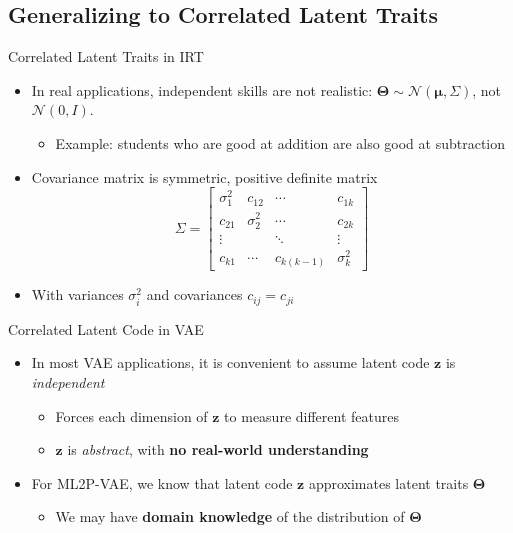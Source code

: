 \documentclass{beamer}
\newcommand{\vect}[1]{\boldsymbol{#1}}
\theoremstyle{definition}
\begin{document}
\subsection{Generalizing to Correlated Latent Traits}

\begin{frame}{Correlated Latent Traits in IRT}
\begin{itemize}
  \item In real applications, independent skills are not realistic: $\vect \Theta \sim \mathcal{N}(\vect \mu, \Sigma)$, not $\mathcal{N}(0,I)$.
  \begin{itemize}
    \item Example: students who are good at addition are also good at subtraction
  \end{itemize}
  \item<2-> Covariance matrix is symmetric, positive definite matrix
  \[\Sigma = \begin{bmatrix}
  \sigma_1^2 & c_{12} & \cdots & c_{1k} \\
  c_{21} & \sigma_2^2 & \cdots & c_{2k} \\
  \vdots & & \ddots & \vdots \\
  c_{k1} & \cdots & c_{k(k-1)} & \sigma_k^2
  \end{bmatrix}\]
  \item<2-> With variances $\sigma_i^2$ and covariances $c_{ij} = c_{ji}$
\end{itemize}
\end{frame}

\begin{frame}{Correlated Latent Code in VAE}
\begin{itemize}
  \item In most VAE applications, it is convenient to assume latent code $\vect z$ is \textit{independent}
    \begin{itemize}
      \item Forces each dimension of $\vect z$ to measure different features
      \item $\vect z$ is \textit{abstract}, with \textbf{no real-world understanding}
    \end{itemize}
  \item<2-> For ML2P-VAE, we know that latent code $\vect z$ approximates latent traits $\vect \Theta$
    \begin{itemize}
      \item<2-> We may have \textbf{domain knowledge} of the distribution of $\vect \Theta$
    \end{itemize}
\end{itemize}
\end{frame}
\end{document}
